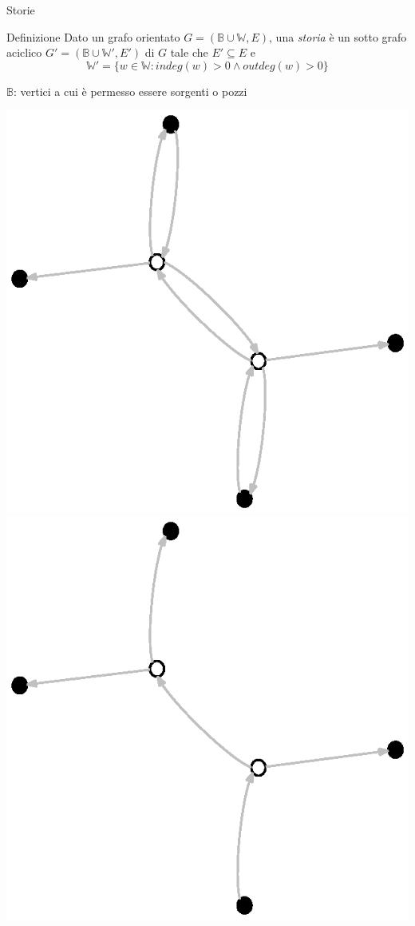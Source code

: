 \documentclass{beamer}
\begin{document}
\begin{frame}{Storie}
  \begin{block}{Definizione}
    Dato un grafo orientato $G = (\mathbb{B} \cup \mathbb{W}, E)$, una
    \emph{storia} \`e un sotto grafo aciclico $G' = (\mathbb{B} \cup
    \mathbb{W'}, E')$ di $G$ tale che $E' \subseteq E $ e
  \begin{displaymath}
    \mathbb{W'} = \{w \in \mathbb{W}: indeg(w) > 0 \wedge outdeg(w)
    > 0\}
  \end{displaymath}
\end{block}
$\mathbb{B}$: vertici a cui \`e permesso essere sorgenti o pozzi
\begin{center}
  \includegraphics[scale=0.4]{images/graph-with-b-setted.eps}
  \includegraphics[scale=0.4]{images/story-example.eps} 

\end{center}
\end{frame}
\end{document}
